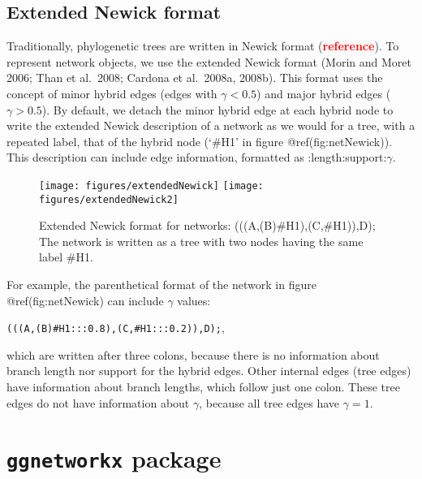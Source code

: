 \documentclass[]{IEEEtran}
\begin{document}
\vspace{-0.25cm}

\hypertarget{extended-newick-format}{%
\subsection{Extended Newick format}\label{extended-newick-format}}

Traditionally, phylogenetic trees are written in Newick format
(\textcolor{red}{\textbf{reference}}). To represent network objects, we
use the extended Newick format (Morin and Moret 2006; Than et al.~2008;
Cardona et al.~2008a, 2008b). This format uses the concept of minor
hybrid edges (edges with \(\gamma < 0.5\)) and major hybrid edges
(\(\gamma > 0.5\)). By default, we detach the minor hybrid edge at each
hybrid node to write the extended Newick description of a network as we
would for a tree, with a repeated label, that of the hybrid node (`\#H1'
in figure @ref(fig:netNewick)). This description can include edge
information, formatted as :length:support:\(\gamma\).

\begin{figure}

{\centering \texttt{[image: figures/extendedNewick]} \texttt{[image: figures/extendedNewick2]} 

}

\caption{Extended Newick format for networks: (((A,(B)\#H1),(C,\#H1)),D); The network is written as a tree with two nodes having the same label \#H1.}\label{fig:netNewick}
\end{figure}

For example, the parenthetical format of the network in figure
@ref(fig:netNewick) can include \(\gamma\) values:

\texttt{(((A,(B)\#H1:::0.8),(C,\#H1:::0.2)),D);},

which are written after three colons, because there is no information
about branch length nor support for the hybrid edges. Other internal
edges (tree edges) have information about branch lengths, which follow
just one colon. These tree edges do not have information about
\(\gamma\), because all tree edges have \(\gamma=1\).

\hypertarget{ggnetworkx-package}{%
\section{\texorpdfstring{\texttt{ggnetworkx}
package}{ggnetworkx package}}\label{ggnetworkx-package}}
\end{document}
